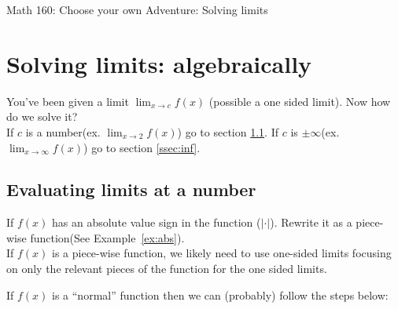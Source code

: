 \documentclass[12pt]{article}
\begin{document}

\begin{center}
    \Large Math 160: Choose your own Adventure: Solving limits
\end{center}

\section{Solving limits: algebraically}

You've been given a limit $\displaystyle{\lim_{x\to c}f(x)}$ (possible a one sided limit). Now how do we solve it?\\

If $c$ is a number(ex. $\lim_{x\rightarrow 2}f(x)$) go to section \ref{ssec:number}. 
If $c$ is $\pm \infty$(ex. $\lim_{x\rightarrow \infty}f(x)$) go to section \ref{ssec:inf}.\\

\subsection{Evaluating limits at a number}
\label{ssec:number}
If $f(x)$ has an absolute value sign in the function ($|\cdot|$). Rewrite it as a piece-wise function(See Example~\ref{ex:abs}).\\

If $f(x)$ is a piece-wise function, we likely need to use one-sided limits focusing on only the relevant pieces of the function for the one sided limits.

If $f(x)$ is a ``normal'' function then we can (probably) follow the steps below:
\end{document}
